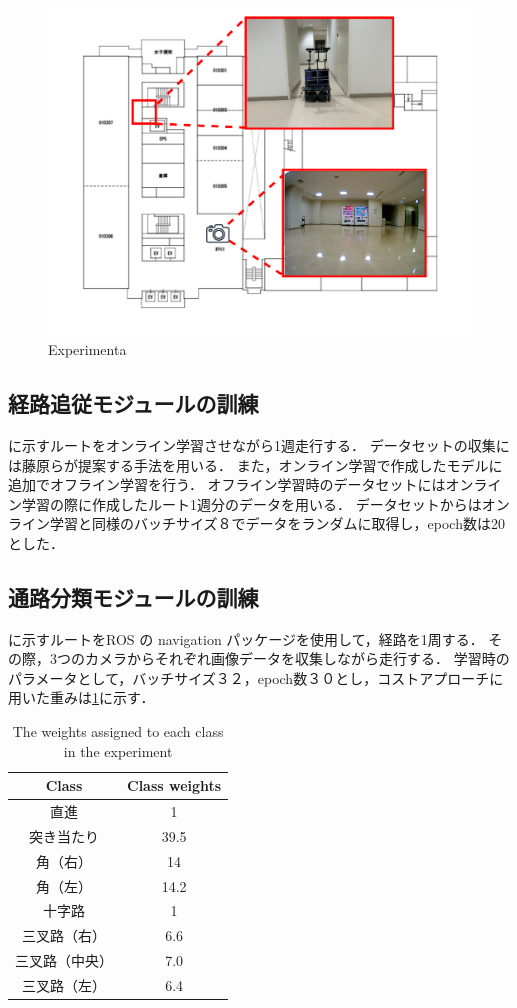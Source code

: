 \begin{figure}
  \centering
  \includegraphics[width=130mm]{images/pdf/ishiguro/keepout.pdf}
  \caption{Experimenta}
  \label{fig:keepout}
\end{figure}

\subsection{経路追従モジュールの訓練}
に示すルートをオンライン学習させながら1週走行する．
データセットの収集には藤原ら\cite{fujiwara2023}が提案する手法を用いる．
また，オンライン学習で作成したモデルに追加でオフライン学習を行う．
オフライン学習時のデータセットにはオンライン学習の際に作成したルート1週分のデータを用いる．
データセットからはオンライン学習と同様のバッチサイズ８でデータをランダムに取得し，epoch数は20とした．

\subsection{通路分類モジュールの訓練}
に示すルートをROS の navigation パッケージを使用して，経路を1周する．
その際，3つのカメラからそれぞれ画像データを収集しながら走行する．
学習時のパラメータとして，バッチサイズ３２，epoch数３０とし，コストアプローチに用いた重みは\ref{tab:cost}に示す．

\begin{table}[htbp]
  \centering
  \caption{The weights assigned to each class in the experiment}\label{tab:cost}
  \begin{tabular}{c|c}
  \hline
  Class & Class weights         \\
  \hline
  直進   & 1\\
  突き当たり   & 39.5\\
  角（右） & 14\\
  角（左）& 14.2 \\
  十字路 & 1  \\
  三叉路（右）& 6.6  \\
  三叉路（中央）& 7.0  \\
  三叉路（左） & 6.4  \\
  \hline
  \end{tabular}
\end{table}

